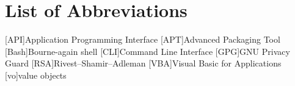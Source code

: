\chapter*{List of Abbreviations} 

\begin{acronym}
	
	[API]{Application Programming Interface}
	[APT]{Advanced Packaging Tool}
	[Bash]{Bourne-again shell}
	[CLI]{Command Line Interface}
	[GPG]{GNU Privacy Guard}
	[RSA]{Rivest–Shamir–Adleman}
	[VBA]{Visual Basic for Applications}
	[vo]{value objects}
	
	
\end{acronym}